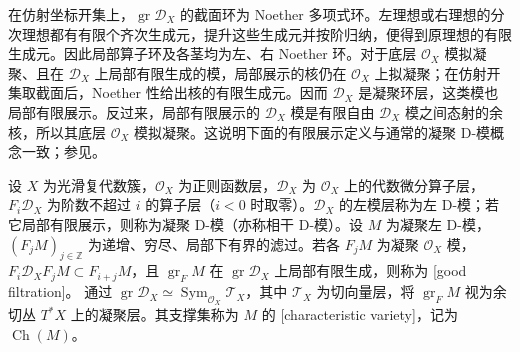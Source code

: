 \ProseParagraphBreak
在仿射坐标开集上，\(\operatorname{gr}\mathcal D_X\) 的截面环为 Noether 多项式环。左理想或右理想的分次理想都有有限个齐次生成元，提升这些生成元并按阶归纳，便得到原理想的有限生成元。因此局部算子环及各茎均为左、右 Noether 环。对于底层 \(\mathcal O_X\) 模拟凝聚、且在 \(\mathcal D_X\) 上局部有限生成的模，局部展示的核仍在 \(\mathcal O_X\) 上拟凝聚；在仿射开集取截面后，Noether 性给出核的有限生成元。因而 \(\mathcal D_X\) 是凝聚环层，这类模也局部有限展示。反过来，局部有限展示的 \(\mathcal D_X\) 模是有限自由 \(\mathcal D_X\) 模之间态射的余核，所以其底层 \(\mathcal O_X\) 模拟凝聚。这说明下面的有限展示定义与通常的凝聚 D-模概念一致；参见\cite[Propositions 1.4.6 and 1.4.9, pp. 26--27]{HottaTakeuchiTanisaki2008DModules}。

\begin{definition}\label{b5:def:D-good-characteristic}
	设 \(X\) 为光滑复代数簇，\(\mathcal O_X\) 为正则函数层，\(\mathcal D_X\) 为 \(\mathcal O_X\) 上的代数微分算子层，\(F_i\mathcal D_X\) 为阶数不超过 \(i\) 的算子层（\(i<0\) 时取零）。\(\mathcal D_X\) 的左模层称为左 D-模；若它局部有限展示，则称为凝聚 D-模（亦称相干 D-模）。设 \(M\) 为凝聚左 D-模，\((F_jM)_{j\in\mathbb Z}\) 为递增、穷尽、局部下有界的滤过。若各 \(F_jM\) 为凝聚 \(\mathcal O_X\) 模， \(F_i\mathcal D_XF_jM\subset F_{i+j}M\)，且 \(\operatorname{gr}_F M\) 在 \(\operatorname{gr}\mathcal D_X\) 上局部有限生成，则称为 [good filtration]。 通过 \(\operatorname{gr}\mathcal D_X\simeq\operatorname{Sym}_{\mathcal O_X}\mathcal T_X\)，其中 \(\mathcal T_X\) 为切向量层，将 \(\operatorname{gr}_F M\) 视为余切丛 \(T^*X\) 上的凝聚层。其支撑集称为 \(M\) 的 [characteristic variety]，记为 \(\operatorname{Ch}(M)\)。
\end{definition}

